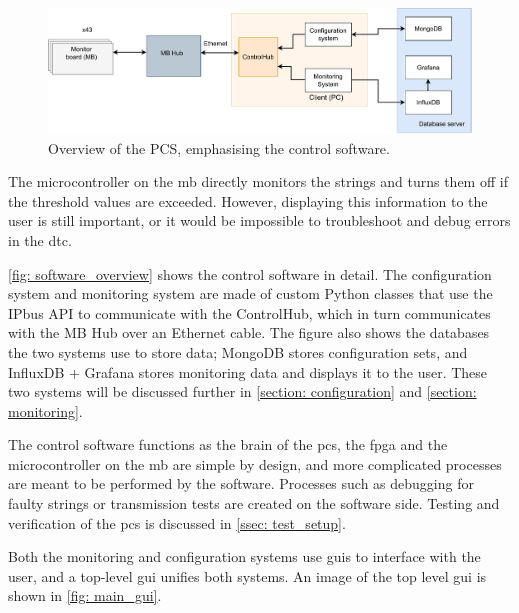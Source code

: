 \documentclass[main.tex]{subfiles}
\begin{document}
\begin{figure}[!htpb]
    \centering
    \includegraphics[width=15cm]{images/PCS_dust.pdf}
    \caption{Overview of the PCS, emphasising the control software.}
    \label{fig: software_overview}
\end{figure}
\FloatBarrier



The microcontroller on the \gls{mb} directly monitors the strings and turns them off if the threshold values are exceeded. However, displaying this information to the user is still important, or it would be impossible to troubleshoot and debug errors in the \gls{dtc}.

\autoref{fig: software_overview} shows the control software in detail. The configuration system and monitoring system are made of custom Python classes that use the IPbus API to communicate with the ControlHub, which in turn communicates with the MB Hub over an Ethernet cable. The figure also shows the databases the two systems use to store data; MongoDB stores configuration sets, and InfluxDB + Grafana stores monitoring data and displays it to the user. These two systems will be discussed further in \autoref{section: configuration} and \autoref{section: monitoring}.

The control software functions as the brain of the \gls{pcs}, the \gls{fpga} and the microcontroller on the \gls{mb} are simple by design, and more complicated processes are meant to be performed by the software. Processes such as debugging for faulty strings or transmission tests are created on the software side. Testing and verification of the \gls{pcs} is discussed in \autoref{ssec: test_setup}.
 
Both the monitoring and configuration systems use \gls{gui}s to interface with the user, and a top-level \gls{gui} unifies both systems. An image of the top level \gls{gui} is shown in \autoref{fig: main_gui}.
\end{document}
